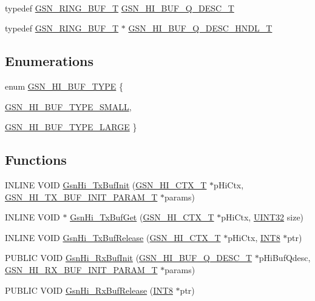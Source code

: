 \paragraph*{}
\begin{DoxyCompactItemize}
\item 
typedef \hyperlink{a00191}{GSN\_\-RING\_\-BUF\_\-T} \hyperlink{a00505_a5592ee510b1e204faaca8ef7fa3fcf49}{GSN\_\-HI\_\-BUF\_\-Q\_\-DESC\_\-T}
\item 
typedef \hyperlink{a00191}{GSN\_\-RING\_\-BUF\_\-T} $\ast$ \hyperlink{a00505_a2b3143f617f573da4922c5888ce7ab72}{GSN\_\-HI\_\-BUF\_\-Q\_\-DESC\_\-HNDL\_\-T}
\end{DoxyCompactItemize}

\subsection*{Enumerations}
\begin{DoxyCompactItemize}
\item 
enum \hyperlink{a00505_af1aed68d5f6d2f9a744d8de12b9adbbe}{GSN\_\-HI\_\-BUF\_\-TYPE} \{ \par
\hyperlink{a00505_af1aed68d5f6d2f9a744d8de12b9adbbea52d186a62d72e859badbc83f426dd566}{GSN\_\-HI\_\-BUF\_\-TYPE\_\-SMALL}, 
\par
\hyperlink{a00505_af1aed68d5f6d2f9a744d8de12b9adbbea53a7c87871450313e72c37988bd04544}{GSN\_\-HI\_\-BUF\_\-TYPE\_\-LARGE}
 \}
\end{DoxyCompactItemize}
\subsection*{Functions}
\begin{DoxyCompactItemize}
\item 
INLINE VOID \hyperlink{a00505_a4f1899901cd2eba1f6dfd6fe610b2ec2}{GsnHi\_\-TxBufInit} (\hyperlink{a00085}{GSN\_\-HI\_\-CTX\_\-T} $\ast$pHiCtx, \hyperlink{a00091}{GSN\_\-HI\_\-TX\_\-BUF\_\-INIT\_\-PARAM\_\-T} $\ast$params)
\item 
INLINE VOID $\ast$ \hyperlink{a00505_ad2866488cc3982386eb5537d46581091}{GsnHi\_\-TxBufGet} (\hyperlink{a00085}{GSN\_\-HI\_\-CTX\_\-T} $\ast$pHiCtx, \hyperlink{a00660_gae1e6edbbc26d6fbc71a90190d0266018}{UINT32} size)
\item 
INLINE VOID \hyperlink{a00505_aad1b8f80f818515f9b785a1051075a43}{GsnHi\_\-TxBufRelease} (\hyperlink{a00085}{GSN\_\-HI\_\-CTX\_\-T} $\ast$pHiCtx, \hyperlink{a00660_ga307b8734c020247f6bac4fcde0dcfbb9}{INT8} $\ast$ptr)
\item 
PUBLIC VOID \hyperlink{a00505_abf6f6a5a7601a77d1b12fafb55d11c98}{GsnHi\_\-RxBufInit} (\hyperlink{a00191}{GSN\_\-HI\_\-BUF\_\-Q\_\-DESC\_\-T} $\ast$pHiBufQdesc, \hyperlink{a00090}{GSN\_\-HI\_\-RX\_\-BUF\_\-INIT\_\-PARAM\_\-T} $\ast$params)
\item 
PUBLIC VOID \hyperlink{a00505_aa067efcd37efd5878d2415b26baac06e}{GsnHi\_\-RxBufRelease} (\hyperlink{a00660_ga307b8734c020247f6bac4fcde0dcfbb9}{INT8} $\ast$ptr)
\end{DoxyCompactItemize}


